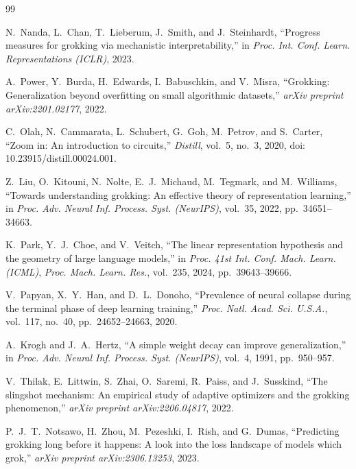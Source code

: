 \documentclass[12pt,openany,a4paper]{book}
\begin{document}
{\renewcommand{\bibname}{References}%
\begin{thebibliography}{99}

N.~Nanda, L.~Chan, T.~Lieberum, J.~Smith, and J.~Steinhardt,
``Progress measures for grokking via mechanistic interpretability,''
in \textit{Proc. Int. Conf. Learn. Representations (ICLR)}, 2023.

A.~Power, Y.~Burda, H.~Edwards, I.~Babuschkin, and V.~Misra,
``Grokking: Generalization beyond overfitting on small algorithmic
datasets,'' \textit{arXiv preprint arXiv:2201.02177}, 2022.

C.~Olah, N.~Cammarata, L.~Schubert, G.~Goh, M.~Petrov, and
S.~Carter,
``Zoom in: An introduction to circuits,''
\textit{Distill}, vol.~5, no.~3, 2020, doi: 10.23915/distill.00024.001.

Z.~Liu, O.~Kitouni, N.~Nolte, E.~J.~Michaud, M.~Tegmark, and
M.~Williams, ``Towards understanding grokking: An effective theory
of representation learning,'' in \textit{Proc. Adv. Neural Inf.
Process. Syst. (NeurIPS)}, vol.~35, 2022, pp.~34651--34663.

K.~Park, Y.~J.~Choe, and V.~Veitch,
``The linear representation hypothesis and the geometry of
large language models,''
in \textit{Proc. 41st Int. Conf. Mach. Learn. (ICML)},
\textit{Proc. Mach. Learn. Res.}, vol.~235, 2024,
pp.~39643--39666.

V.~Papyan, X.~Y.~Han, and D.~L.~Donoho,
``Prevalence of neural collapse during the terminal phase of
deep learning training,''
\textit{Proc. Natl. Acad. Sci. U.S.A.}, vol.~117, no.~40,
pp.~24652--24663, 2020.

A.~Krogh and J.~A.~Hertz,
``A simple weight decay can improve generalization,''
in \textit{Proc. Adv. Neural Inf. Process. Syst. (NeurIPS)},
vol.~4, 1991, pp.~950--957.

V.~Thilak, E.~Littwin, S.~Zhai, O.~Saremi, R.~Paiss, and
J.~Susskind,
``The slingshot mechanism: An empirical study of adaptive
optimizers and the grokking phenomenon,''
\textit{arXiv preprint arXiv:2206.04817}, 2022.

P.~J.~T.~Notsawo, H.~Zhou, M.~Pezeshki, I.~Rish, and G.~Dumas,
``Predicting grokking long before it happens: A look into the
loss landscape of models which grok,''
\textit{arXiv preprint arXiv:2306.13253}, 2023.


\end{thebibliography}}
\end{document}

